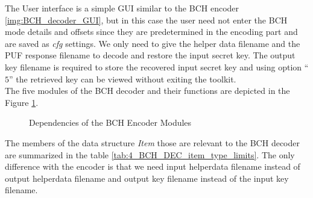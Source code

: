 The User interface is a simple GUI similar to the BCH encoder \ref{img:BCH_decoder_GUI}, but in this case the user need not enter the BCH mode details and offsets since they are predetermined in the encoding part and are saved as \emph{cfg} settings. We only need to give the helper data filename and the PUF response filename to decode and restore the input secret key. The output key filename is required to store the recovered input secret key and using option ``$5$'' the retrieved key can be viewed without
exiting the toolkit.\\

The five modules of the BCH decoder and their functions are depicted in the Figure \ref{img:bchdec_fns}.
\begin{figure}
\centering
{}
\caption{Dependencies of the BCH Encoder Modules}
\label{img:bchdec_fns}
\end{figure}

The members of the data structure \emph{Item} those are relevant to the BCH decoder are summarized in the table \ref{tab:4_BCH_DEC_item_type_limits}. The only difference with the encoder is that we need input helperdata filename instead of output helperdata filename and output key filename instead of the input key filename.


